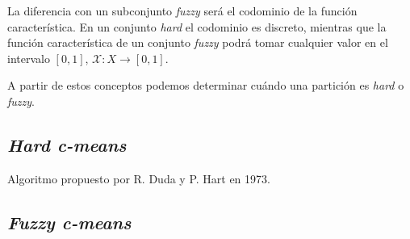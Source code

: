 \documentclass[10pt,a4paper]{article} %
\theoremstyle{definition}
\begin{document}
La diferencia con un subconjunto \textit{fuzzy} será el codominio de la función característica. En un conjunto \textit{hard} el codominio es discreto, mientras que la función característica de un conjunto \textit{fuzzy} podrá tomar cualquier valor en el intervalo $[0,1]$, $\mathcal{X}:X \to [0,1]$.

A partir de estos conceptos podemos determinar cuándo una partición es \textit{hard} o \textit{fuzzy}.


    
\subsection{\textit{Hard c-means}}
Algoritmo propuesto por R. Duda y P. Hart en 1973.
    
\subsection{\textit{Fuzzy c-means}}
\end{document}
